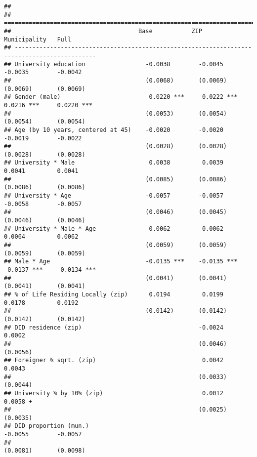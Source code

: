 \documentclass[
]{article}
\begin{document}
\begin{verbatim}
## 
## =============================================================================================
##                                    Base           ZIP            Municipality   Full         
## ---------------------------------------------------------------------------------------------
## University education                 -0.0038        -0.0045        -0.0035        -0.0042    
##                                      (0.0068)       (0.0069)       (0.0069)       (0.0069)   
## Gender (male)                         0.0220 ***     0.0222 ***     0.0216 ***     0.0220 ***
##                                      (0.0053)       (0.0054)       (0.0054)       (0.0054)   
## Age (by 10 years, centered at 45)    -0.0020        -0.0020        -0.0019        -0.0022    
##                                      (0.0028)       (0.0028)       (0.0028)       (0.0028)   
## University * Male                     0.0038         0.0039         0.0041         0.0041    
##                                      (0.0085)       (0.0086)       (0.0086)       (0.0086)   
## University * Age                     -0.0057        -0.0057        -0.0058        -0.0057    
##                                      (0.0046)       (0.0045)       (0.0046)       (0.0046)   
## University * Male * Age               0.0062         0.0062         0.0064         0.0062    
##                                      (0.0059)       (0.0059)       (0.0059)       (0.0059)   
## Male * Age                           -0.0135 ***    -0.0135 ***    -0.0137 ***    -0.0134 ***
##                                      (0.0041)       (0.0041)       (0.0041)       (0.0041)   
## % of Life Residing Locally (zip)      0.0194         0.0199         0.0178         0.0192    
##                                      (0.0142)       (0.0142)       (0.0142)       (0.0142)   
## DID residence (zip)                                 -0.0024                        0.0002    
##                                                     (0.0046)                      (0.0056)   
## Foreigner % sqrt. (zip)                              0.0042                        0.0043    
##                                                     (0.0033)                      (0.0044)   
## University % by 10% (zip)                            0.0012                        0.0058 +  
##                                                     (0.0025)                      (0.0035)   
## DID proportion (mun.)                                              -0.0055        -0.0057    
##                                                                    (0.0081)       (0.0098)   

\end{verbatim}
\end{document}
